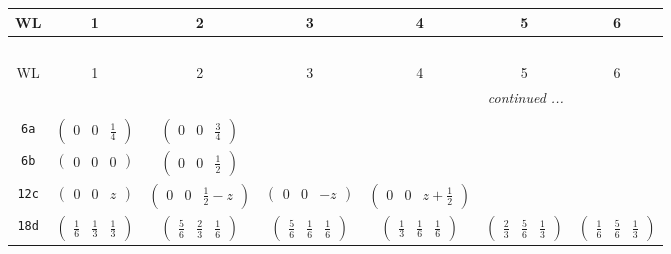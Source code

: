 \documentclass[fleqn,9pt,landscape]{jsarticle}
\begin{document}
\begin{center}
\renewcommand{\arraystretch}{1.2}
\begin{longtable}{ccccccc}
 \hline \hline
WL & 1 & 2 & 3 & 4 & 5 & 6 \\ \hline \endfirsthead

\multicolumn{6}{l}{\tablename\ \thetable{}} \\
 \hline \hline
WL & 1 & 2 & 3 & 4 & 5 & 6 \\ \hline \endhead

 \hline \hline
\multicolumn{6}{r}{\footnotesize\it continued ...} \\ \endfoot

 \hline \hline
\multicolumn{6}{r}{} \\ \endlastfoot

{\tt 6a} & $ \begin{pmatrix} 0 & 0 & \frac{1}{4} \end{pmatrix} $ & $ \begin{pmatrix} 0 & 0 & \frac{3}{4} \end{pmatrix} $ & $  $ & $  $ & $  $ & $  $ \\ \hline
{\tt 6b} & $ \begin{pmatrix} 0 & 0 & 0 \end{pmatrix} $ & $ \begin{pmatrix} 0 & 0 & \frac{1}{2} \end{pmatrix} $ & $  $ & $  $ & $  $ & $  $ \\ \hline
{\tt 12c} & $ \begin{pmatrix} 0 & 0 & z \end{pmatrix} $ & $ \begin{pmatrix} 0 & 0 & \frac{1}{2} - z \end{pmatrix} $ & $ \begin{pmatrix} 0 & 0 & - z \end{pmatrix} $ & $ \begin{pmatrix} 0 & 0 & z + \frac{1}{2} \end{pmatrix} $ & $  $ & $  $ \\ \hline
{\tt 18d} & $ \begin{pmatrix} \frac{1}{6} & \frac{1}{3} & \frac{1}{3} \end{pmatrix} $ & $ \begin{pmatrix} \frac{5}{6} & \frac{2}{3} & \frac{1}{6} \end{pmatrix} $ & $ \begin{pmatrix} \frac{5}{6} & \frac{1}{6} & \frac{1}{6} \end{pmatrix} $ & $ \begin{pmatrix} \frac{1}{3} & \frac{1}{6} & \frac{1}{6} \end{pmatrix} $ & $ \begin{pmatrix} \frac{2}{3} & \frac{5}{6} & \frac{1}{3} \end{pmatrix} $ & $ \begin{pmatrix} \frac{1}{6} & \frac{5}{6} & \frac{1}{3} \end{pmatrix} $ \\ \hline

\end{longtable}
\end{center}
\end{document}
